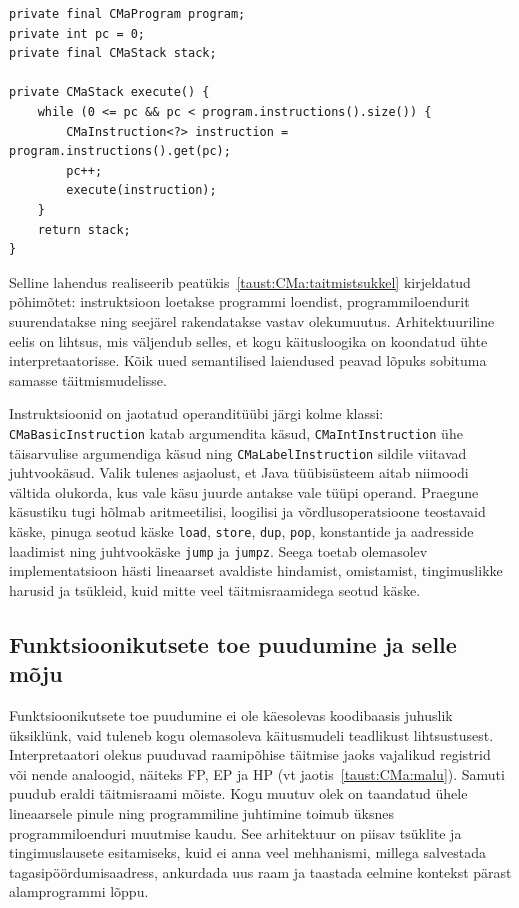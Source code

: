 \begin{verbatim}
private final CMaProgram program;
private int pc = 0;
private final CMaStack stack;

private CMaStack execute() {
	while (0 <= pc && pc < program.instructions().size()) {
		CMaInstruction<?> instruction = program.instructions().get(pc);
		pc++;
		execute(instruction);
	}
	return stack;
}
\end{verbatim}

Selline lahendus realiseerib peatükis~\ref{taust:CMa:taitmistsukkel} kirjeldatud põhimõtet: instruktsioon loetakse programmi loendist, programmiloendurit suurendatakse ning seejärel rakendatakse vastav olekumuutus. Arhitektuuriline eelis on lihtsus, mis väljendub selles, et kogu käitusloogika on koondatud ühte interpretaatorisse. Kõik uued semantilised laiendused peavad lõpuks sobituma samasse täitmismudelisse.

Instruktsioonid on jaotatud operanditüübi järgi kolme klassi: \texttt{CMaBasicInstruction} katab argumendita käsud, \texttt{CMaIntInstruction} ühe täisarvulise argumendiga käsud ning \texttt{CMaLabelInstruction} sildile viitavad juhtvookäsud. Valik tulenes asjaolust, et Java tüübisüsteem aitab niimoodi vältida olukorda, kus vale käsu juurde antakse vale tüüpi operand. Praegune käsustiku tugi hõlmab aritmeetilisi, loogilisi ja võrdlusoperatsioone teostavaid käske, pinuga seotud käske \texttt{load}, \texttt{store}, \texttt{dup}, \texttt{pop}, konstantide ja aadresside laadimist ning juhtvookäske \texttt{jump} ja \texttt{jumpz}. Seega toetab olemasolev implementatsioon hästi lineaarset avaldiste hindamist, omistamist, tingimuslikke harusid ja tsükleid, kuid mitte veel täitmisraamidega seotud käske.

\subsection{Funktsioonikutsete toe puudumine ja selle mõju}\label{implementatsioon:puudumine}

Funktsioonikutsete toe puudumine ei ole käesolevas koodibaasis juhuslik üksiklünk, vaid tuleneb kogu olemasoleva käitusmudeli teadlikust lihtsustusest. Interpretaatori olekus puuduvad raamipõhise täitmise jaoks vajalikud registrid või nende analoogid, näiteks FP, EP ja HP (vt jaotis~\ref{taust:CMa:malu}). Samuti puudub eraldi täitmisraami mõiste. Kogu muutuv olek on taandatud ühele lineaarsele pinule ning programmiline juhtimine toimub üksnes programmiloenduri muutmise kaudu. See arhitektuur on piisav tsüklite ja tingimuslausete esitamiseks, kuid ei anna veel mehhanismi, millega salvestada tagasipöördumisaadress, ankurdada uus raam ja taastada eelmine kontekst pärast alamprogrammi lõppu.

